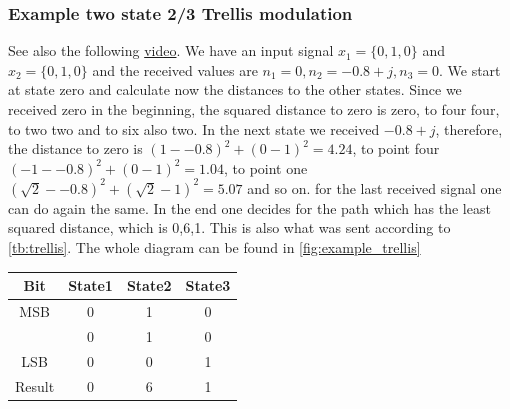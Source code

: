 \subsubsection{Example two state 2/3 Trellis modulation}
See also the following \href{https://youtu.be/rnjy4_gXLAg}{video}. We have an input signal $x_1=\{0,1,0\}$ and $x_2=\{0,1,0\}$ and the received values are $n_1=0, n_2=-0.8+j, n_3=0$. We start at state zero and calculate now the distances to the other states. Since we received zero in the beginning, the squared distance  to zero is zero, to four four, to two two and to six also two. In the next state we received $-0.8+j$, therefore, the distance to zero is $(1--0.8)^2+(0-1)^2=4.24$, to point four $(-1--0.8)^2+(0-1)^2=1.04$, to point one $(\sqrt{2}--0.8)^2+(\sqrt{2}-1)^2=5.07$ and so on. for the last received signal one can do again the same. In the end one decides for the path which has the least squared distance, which is 0,6,1. This is also what was sent according to \autoref{tb:trellis}. The whole diagram can be found in \autoref{fig:example_trellis}
\begin{table}[h!]
\centering
 \begin{tabular}{||c c c c||} 
 \hline
 Bit & State1 & State2 & State3 \\ [0.5ex] 
 \hline\hline
 MSB & 0 & 1 & 0 \\ 
  & 0 & 1 & 0 \\
 LSB & 0 & 0 & 1 \\
 Result & 0 & 6 & 1 \\
 \hline
 \end{tabular}
 \label{tb:trellis}
 \end{table}
\FloatBarrier 
